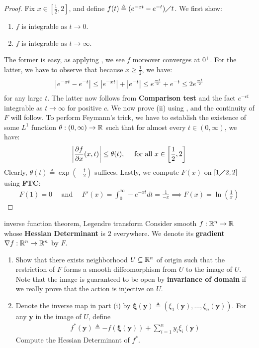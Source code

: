 \documentclass{report}
\begin{document}
\begin{proof}
Fix $x \in [\frac{1}{2},2]$, and  define $f(t)\triangleq (e^{-xt}-e^{-t})\diagup t$. We first show: 
\begin{enumerate}[label=(\roman*)]
  \item $f$ is integrable as $t \rightarrow 0$.
  \item $f$ is integrable as $t \rightarrow  \infty$.   
\end{enumerate}
The former is easy, as applying   , we see $f$ moreover converges at $0^+$. For the latter, we have to observe that because $x\geq \frac{1}{2}$, we have:   
\begin{align}
\label{b1}
\left|e^{-xt}-e^{-t}\right|\leq \left|e^{-xt}\right|+ \left|e^{-t}\right|\leq e^{\frac{-t}{2}}+ e^{-t}\leq 2e^{\frac{-t}{2}}
\end{align}
for any large $t$. The latter now follows from \textbf{Comparison test} and the fact $e^{-ct}$ integrable as $t \rightarrow \infty$ for positive $c$. We now prove (ii) using , and the continuity of $F$ will follow. To perform Feymann's trick, we have to establish the existence of some $L^1$ function $\theta:(0,\infty)\rightarrow \mathbb{R}$ such that for almost every $t \in (0,\infty)$, we have: 
\begin{align*}
\left|\frac{\partial f}{\partial x}(x,t)\right|\leq \theta (t),\quad \text{ for all }x \in \left[\frac{1}{2},2\right]
\end{align*}
Clearly, $\theta (t)\triangleq \exp \left(- \frac{t}{2}\right)$ suffices. Lastly, we compute $F(x)$ on $[1\diagup 2,2]$ using  \textbf{FTC}: 
\begin{align*}
 F(1)=0\quad \text{ and }\quad F'(x)= \int_0^{\infty} -e^{-xt}dt= \frac{1}{-x} \implies F(x)= \ln \left(\frac{1}{x} \right)
\end{align*}
\end{proof} 
\begin{question}{inverse function theorem, Legendre transform}{}
  Consider smooth $f:\mathbb{R}^n\rightarrow \mathbb{R}$ whose \textbf{Hessian Determinant} is $2$  everywhere. We denote its \textbf{gradient} $\nabla f:\mathbb{R}^n\rightarrow \mathbb{R}^n$ by $F$.  
\begin{enumerate}[label=(\roman*)]
  \item Show that there exists neighborhood $U \subseteq \mathbb{R}^n$ of origin such that the restriction of $F$ forms a smooth diffeomorphism from $U$ to the image of  $U$. Note that the image is guaranteed to be open by \textbf{invariance of domain} if we really prove that the action is injective on $U$.  
\item Denote the inverse map in part (i) by $\boldsymbol{\xi}(\textbf{y})\triangleq (\xi_1 (\textbf{y}),\dots ,\xi_n(\textbf{y}))$. For any $\textbf{y}$ in the image of $U$, define
\begin{align*}
  f^*(\textbf{y})\triangleq -f (\boldsymbol{\xi}(\textbf{y}))+ \sum_{i=1}^n y_i \xi_i (\textbf{y})
\end{align*}
Compute the Hessian Determinant of $f^*$. 
\end{enumerate}
\end{question}
\end{document}
